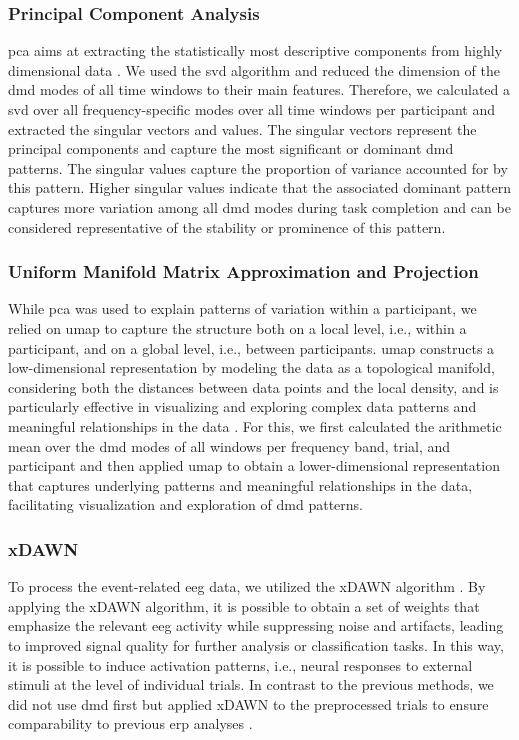\subsubsection{Principal Component Analysis}
\Gls{pca} aims at extracting the statistically most descriptive components from highly dimensional data \cite{BruntonKutz2019}. We used the \gls{svd} algorithm and reduced the dimension of the \gls{dmd} modes of all time windows to their main features. Therefore, we calculated a \gls{svd} over all frequency-specific modes over all time windows per participant and extracted the singular vectors and values. The singular vectors represent the principal components and capture the most significant or dominant \gls{dmd} patterns. The singular values capture the proportion of variance accounted for by this pattern. Higher singular values indicate that the associated dominant pattern captures more variation among all \gls{dmd} modes during task completion and can be considered representative of the stability or prominence of this pattern.

\subsubsection{Uniform Manifold Matrix Approximation and Projection}
While \gls{pca} was used to explain patterns of variation within a participant, we relied on \gls{umap} to capture the structure both on a local level, i.e., within a participant, and on a global level, i.e., between participants. \Gls{umap} constructs a low-dimensional representation by modeling the data as a topological manifold, considering both the distances between data points and the local density, and is particularly effective in visualizing and exploring complex data patterns and meaningful relationships in the data \cite{Mcinnes2018}. For this, we first calculated the arithmetic mean over the \gls{dmd} modes of all windows per frequency band, trial, and participant and then applied \gls{umap} to obtain a lower-dimensional representation that captures underlying patterns and meaningful relationships in the data, facilitating visualization and exploration of \gls{dmd} patterns.

\subsubsection{xDAWN}
To process the event-related \gls{eeg} data, we utilized the xDAWN algorithm \cite{Rivet2009}. By applying the xDAWN algorithm, it is possible to obtain a set of weights that emphasize the relevant \gls{eeg} activity while suppressing noise and artifacts, leading to improved signal quality for further analysis or classification tasks. In this way, it is possible to induce activation patterns, i.e., neural responses to external stimuli at the level of individual trials. In contrast to the previous methods, we did not use \gls{dmd} first but applied xDAWN to the preprocessed trials to ensure comparability to previous \gls{erp} analyses \cite{Reuter2019}.

